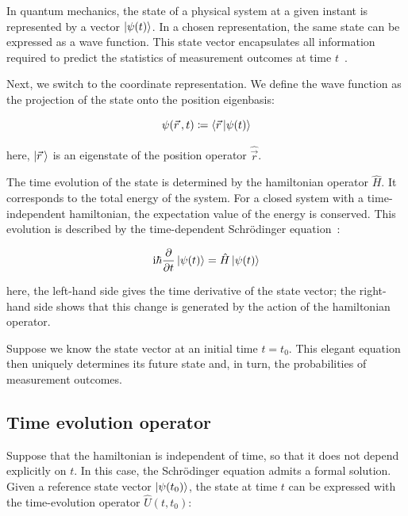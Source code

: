 In quantum mechanics, the state of a physical system at a given instant is represented by a vector $\ket{\psi(t)}$.
In a chosen representation, the same state can be expressed as a wave function.
This state vector encapsulates all information required to predict the statistics of measurement outcomes at time $t$~\cite{cohentannoudji1977quantum}.

Next, we switch to the coordinate representation.
We define the wave function as the projection of the state onto the position eigenbasis:

\begin{equation}
    \psi(\vec{r}\,,t)\coloneqq \braket{\vec{r}\,|\psi(t)}
\label{coordinate_representation_definition}
\end{equation}

here, $\ket{\vec{r}\,}$ is an eigenstate of the position operator $\hat{\vec{r}}$.

The time evolution of the state is determined by the hamiltonian operator $\hat{H}$.
It corresponds to the total energy of the system.
For a closed system with a time-independent hamiltonian, the expectation value of the energy is conserved. This evolution is described by the time-dependent Schrödinger equation~\cite{shankar2012principles}:

\begin{equation}
    \mathrm{i}\hbar\frac{\partial}{\partial t}\ket{\psi(t)}=\hat{H}\ket{\psi(t)}
\label{time-dependent_Schrodinger_equation}
\end{equation}

here, the left-hand side gives the time derivative of the state vector;
the right-hand side shows that this change is generated by the action of the hamiltonian operator.

Suppose we know the state vector at an initial time $t=t_0$. This elegant equation then uniquely determines its future state and, in turn, the probabilities of measurement outcomes.

\subsection{Time evolution operator}

Suppose that the hamiltonian is independent of time, so that it does not depend explicitly on $t$.
In this case, the Schrödinger equation admits a formal solution.
Given a reference state vector $\ket{\psi(t_0)}$,
the state at time $t$ can be expressed with the time-evolution operator $\hat{U}(t,t_0)$:

